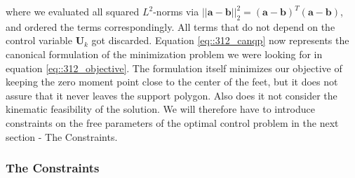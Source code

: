 where we evaluated all squared $L^2$-norms via $||\bm{a}-\bm{b}||^2_2 = (\bm{a}-\bm{b})^T(\bm{a}-\bm{b})$, and ordered the terms correspondingly. All terms that do not depend on the control variable $\bm{U}_k$ got discarded. Equation \ref{eq::312_canqp} now represents the canonical formulation of the minimization problem we were looking for in equation \ref{eq::312_objective}. The formulation itself minimizes our objective of keeping the zero moment point close to the center of the feet, but it does not assure that it never leaves the support polygon. Also does it not consider the kinematic feasibility of the solution. We will therefore have to introduce constraints on the free parameters of the optimal control problem in the next section - The Constraints.
\subsubsection{The Constraints}
\cite{herdt2010walking} %
\cite{naveau2016reactive} %
\subsubsection{}